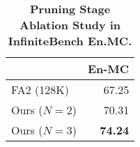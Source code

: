 \begin{wraptable}[8]{r}{3.2cm}
\vspace{-4.5ex}
\caption{\textbf{Pruning Stage Ablation Study in InfiniteBench En.MC.}}
\centering
\small
\vspace{1.0em}
\label{tab:stage_ablation}
\begin{tabular}{l@{\hskip-2pt}r}\toprule
&En-MC \\\midrule
FA2 (128K) &67.25 \\
Ours ($N=2$) &70.31 \\
Ours ($N=3$) &\textbf{74.24} \\
\bottomrule
\end{tabular}
\end{wraptable}